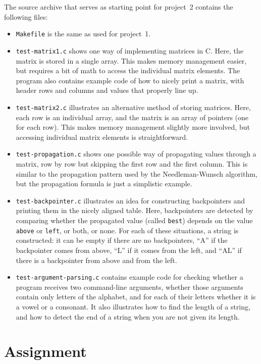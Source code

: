 \documentclass[a4paper,10pt]{article}
\begin{document}
The source archive that serves as starting point for project~2 contains the following files:

\begin{itemize}
\item
  \texttt{Makefile} is the same as used for project~1.
\item
  \texttt{test-matrix1.c} shows one way of implementing matrices in C.
  Here, the matrix is stored in a single array.
  This makes memory management easier, but requires a bit of math to access the individual matrix elements.
  The program also contains example code of how to nicely print a matrix, with header rows and columns and values that properly line up.
\item
  \texttt{test-matrix2.c} illustrates an alternative method of storing matrices.
  Here, each row is an individual array, and the matrix is an array of pointers (one for each row).
  This makes memory management slightly more involved, but accessing individual matrix elements is straightforward.
\item
  \texttt{test-propagation.c} shows one possible way of propagating values through a matrix, row by row but skipping the first row and the first column.
  This is similar to the propagation pattern used by the Needleman-Wunsch algorithm, but the propagation formula is just a simplistic example.
\item
  \texttt{test-backpointer.c} illustrates an idea for constructing backpointers and printing them in the nicely aligned table.
  Here, backpointers are detected by comparing whether the propagated value (called \texttt{best}) depends on the value \texttt{above} or \texttt{left}, or both, or none.
  For each of these situations, a string is constructed: it can be empty if there are no backpointers, ``A'' if the backpointer comes from above, ``L'' if it comes from the left, and ``AL'' if there is a backpointer from above and from the left.
\item
  \texttt{test-argument-parsing.c} contains example code for checking whether a program receives two command-line arguments, whether those arguments contain only letters of the alphabet, and for each of their letters whether it is a vowel or a consonant.
  It also illustrates how to find the length of a string, and how to detect the end of a string when you are not given its length.
\end{itemize}



\section{Assignment}
\end{document}
